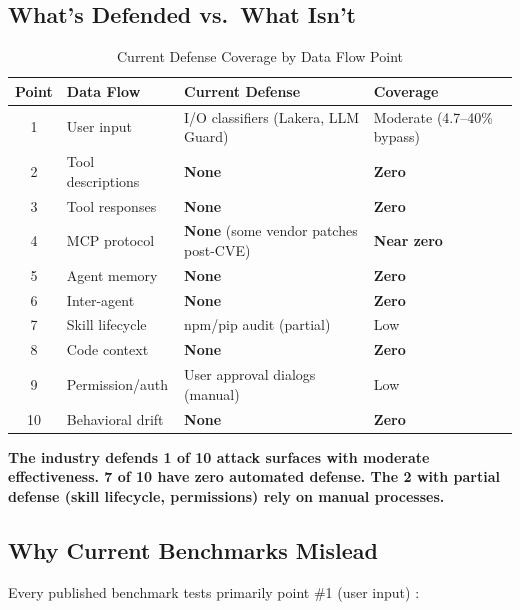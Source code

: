\documentclass[11pt,letterpaper]{article}
\begin{document}
\subsection{What's Defended vs.\ What Isn't}

\begin{table}[htbp]
\centering
\caption{Current Defense Coverage by Data Flow Point}
\label{tab:defense}
\begin{tabularx}{\textwidth}{clXl}
\toprule
\textbf{Point} & \textbf{Data Flow} & \textbf{Current Defense} & \textbf{Coverage} \\
\midrule
1 & User input & I/O classifiers (Lakera, LLM Guard) & Moderate (4.7--40\% bypass) \cite{grayswan,rlinject} \\
2 & Tool descriptions & \textbf{None} & \textbf{Zero} \\
3 & Tool responses & \textbf{None} & \textbf{Zero} \\
4 & MCP protocol & \textbf{None} (some vendor patches post-CVE) & \textbf{Near zero} \\
5 & Agent memory & \textbf{None} & \textbf{Zero} \\
6 & Inter-agent & \textbf{None} & \textbf{Zero} \\
7 & Skill lifecycle & npm/pip audit (partial) & Low \\
8 & Code context & \textbf{None} & \textbf{Zero} \\
9 & Permission/auth & User approval dialogs (manual) & Low \\
10 & Behavioral drift & \textbf{None} & \textbf{Zero} \\
\bottomrule
\end{tabularx}
\end{table}

\textbf{The industry defends 1 of 10 attack surfaces with moderate effectiveness. 7 of 10 have zero automated defense. The 2 with partial defense (skill lifecycle, permissions) rely on manual processes.}


\subsection{Why Current Benchmarks Mislead}

Every published benchmark tests primarily point \#1 (user input) \cite{pint,hacka,tensortrust}:
\end{document}
